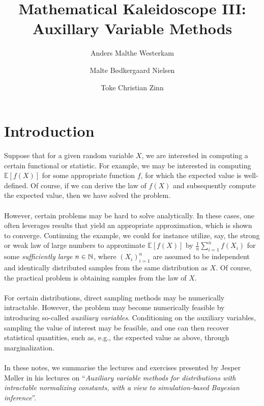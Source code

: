 \documentclass{article}
\title{\LARGE Mathematical Kaleidoscope III: \\ \large Auxillary Variable Methods}
\author[1]{Anders Malthe Westerkam}
\author[2]{Malte Bødkergaard Nielsen}
\author[3]{Toke Christian Zinn}
\affil[1]{amw@es.aau.dk}
\affil[2]{maltebn@math.aau.dk}
\affil[3]{tokecz@math.aau.dk}
\begin{document}
\maketitle
\section*{Introduction}
Suppose that for a given random variable $X$, we are interested in computing a certain functional or statistic. For example, we may be interested in computing $\mathbb{E}[f(X)]$ for some appropriate function $f$, for which the expected value is well-defined. Of course, if we can derive the law of $f(X)$ and subsequently compute the expected value, then we have solved the problem. \\\\
However, certain problems may be hard to solve analytically. In these cases, one often leverages results that yield an appropriate approximation, which is shown to converge. Continuing the example, we could for instance utilize, say, the strong or weak law of large numbers to approximate  $\mathbb{E}[f(X)]$ by $\frac{1}{n} \sum_{i = 1}^n f(X_i)$ for some \textit{sufficiently large} $n\in\mathbb{N}$, where $(X_i)_{i = 1}^n$ are assumed to be independent and identically distributed samples from the same distribution as $X$. Of course, the practical problem is obtaining samples from the law of $X$. \\\\
For certain distributions, direct sampling methods may be numerically intractable. However, the problem may become numerically feasible by introducing so-called \textit{auxiliary variables}. Conditioning on the auxiliary variables, sampling the value of interest may be feasible, and one can then recover statistical quantities, such as, e.g., the expected value as above, through marginalization. \\\\
In these notes, we summarise the lectures and exercises presented by Jesper Møller in his lectures on ``\textit{Auxiliary variable methods for distributions with intractable normalizing constants, with a view to simulation-based Bayesian inference}''.
\end{document}
